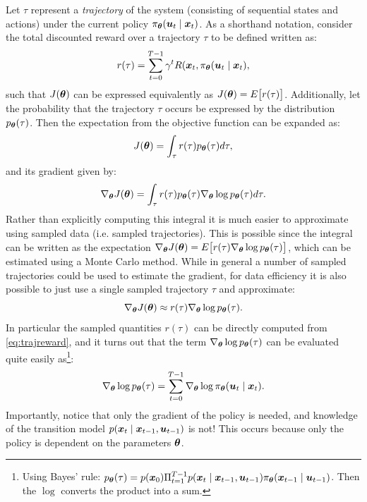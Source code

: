 Let $\tau$ represent a \textit{trajectory} of the system (consisting of sequential states and actions) under the current policy $\pi_{\bm{\theta}}(\bm{u}_t \mid \bm{x}_t)$. As a shorthand notation, consider the total discounted reward over a trajectory $\tau$ to be defined written as:
\begin{equation} \label{eq:trajreward}
    r(\tau) = \sum_{t=0}^{T-1} \gamma^tR(\bm{x}_t, \pi_{\bm{\theta}}(\bm{u}_t \mid \bm{x}_t),
\end{equation}
such that $J(\bm{\theta})$ can be expressed equivalently as $J(\bm{\theta}) = E\big[r(\tau)\big]$. Additionally, let the probability that the trajectory $\tau$ occurs be expressed by the distribution $p_{\bm{\theta}}(\tau)$. Then the expectation from the objective function can be expanded as:
\begin{equation*}
J(\bm{\theta}) = \int_\tau r(\tau)p_{\bm{\theta}}(\tau) d\tau,
\end{equation*}
and its gradient given by:
\begin{equation*}
\nabla_{\bm{\theta}} J(\bm{\theta}) = \int_\tau r(\tau)p_{\bm{\theta}}(\tau) \nabla_{\bm{\theta}} \log p_{\bm{\theta}}(\tau) d\tau.
\end{equation*}
Rather than explicitly computing this integral it is much easier to approximate using sampled data (i.e. sampled trajectories). This is possible since the integral can be written as the expectation $\nabla_{\bm{\theta}} J(\bm{\theta}) = E\big[r(\tau)\nabla_{\bm{\theta}} \log p_{\bm{\theta}}(\tau)\big]$, which can be estimated using a Monte Carlo method. While in general a number of sampled trajectories could be used to estimate the gradient, for data efficiency it is also possible to just use a single sampled trajectory $\tau$ and approximate:
\begin{equation} \label{eq:policygradapprox}
\nabla_{\bm{\theta}} J(\bm{\theta}) \approx r(\tau) \nabla_{\bm{\theta}} \log p_{\bm{\theta}}(\tau).
\end{equation}
In particular the sampled quantities $r(\tau)$ can be directly computed from \eqref{eq:trajreward}, and it turns out that the term $\nabla_{\bm{\theta}} \log p_{\bm{\theta}}(\tau)$ can be evaluated quite easily as\footnote{Using Bayes' rule: $p_{\bm{\theta}}(\tau) = p(\bm{x}_0) \Pi_{t=1}^{T-1} p(\bm{x}_t \mid \bm{x}_{t-1}, \bm{u}_{t-1})\pi_{\bm{\theta}}(\bm{x}_{t-1} \mid \bm{u}_{t-1})$. Then the $\log$ converts the product into a sum.}:
\begin{equation} \label{eq:gradlogterm}
\nabla_{\bm{\theta}} \log p_{\bm{\theta}}(\tau) = \sum_{t=0}^{T-1} \nabla_{\bm{\theta}} \log \pi_{\bm{\theta}}(\bm{u}_t \mid \bm{x}_t).
\end{equation}
Importantly, notice that only the gradient of the policy is needed, and knowledge of the transition model $p(\bm{x}_t \mid \bm{x}_{t-1}, \bm{u}_{t-1})$ is not! This occurs because only the policy is dependent on the parameters $\bm{\theta}$.

